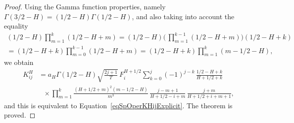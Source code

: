 \documentclass[10pt,a4paper]{amsart}
\begin{document}
\begin{proof}
Using the Gamma function properties, namely $\Gamma(3/2-H) = (1/2-H) \Gamma(1/2-H)$, and also taking into account the equality
\begin{gather*}
  (1/2-H) \prod\limits_{m=1}^k (1/2-H+m) = (1/2-H) \biggl( \, \prod\limits_{m=1}^{k-1} (1/2-H+m) \biggr) (1/2-H+k) \\
  = (1/2-H+k) \prod\limits_{m=0}^{k-1} (1/2-H+m) = (1/2-H+k) \prod\limits_{m=1}^k (m-1/2-H),
\end{gather*}
we obtain
\begin{align*}
  K_{ij}^H & = a_H \Gamma(1/2-H) \sqrt{\frac{2j+1}{T}} \, F_i^{H+1/2} \sum\limits_{k=0}^j (-1)^{j-k} \, \frac{1/2-H+k}{H+1/2+k} \\
  & \ \ \ {} \times \prod\limits_{m=1}^k \frac{(H+1/2+m)^2 (m-1/2-H)}{m^3} \, \frac{j-m+1}{H+1/2-i+m} \, \frac{j+m}{H+1/2+i+m+1},
\end{align*}
and this is equivalent to Equation~\eqref{eqSpOperKHijExplicit}. The theorem is proved.
\end{proof}
\end{document}
